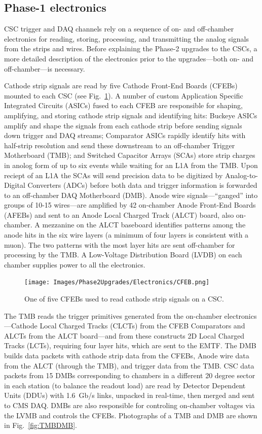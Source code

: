 \subsection{Phase-1 electronics} \label{sec:Phase1CSCelectronics}

CSC trigger and DAQ channels rely on a sequence of on- and off-chamber electronics for reading, storing, processing, and transmitting the analog signals from the strips and wires. Before explaining the Phase-2 upgrades to the CSCs, a more detailed description of the electronics prior to the upgrades---both on- and off-chamber---is necessary. 

Cathode strip signals are read by five Cathode Front-End Boards (CFEBs) mounted to each CSC (see Fig.~\ref{fig:CFEB}). A number of custom Application Specific Integrated Circuits (ASICs) fused to each CFEB are responsible for shaping, amplifying, and storing cathode strip signals and identifying hits: Buckeye ASICs amplify and shape the signals from each cathode strip before sending signals down trigger and DAQ streams; Comparator ASICs rapidly identify hits with half-strip resolution and send these downstream to an off-chamber Trigger Motherboard (TMB); and Switched Capacitor Arrays (SCAs) store strip charges in anolog form of up to six events while waiting for an L1A from the TMB. Upon reciept of an L1A the SCAs will send precision data to be digitized by Analog-to-Digital Converters (ADCs) before both data and trigger information is forwarded to an off-chamber DAQ Motherboard (DMB). Anode wire signals---``ganged'' into groups of 10-15 wires---are amplified by 42 on-chamber Anode Front-End Boards (AFEBs) and sent to an Anode Local Charged Track (ALCT) board, also on-chamber. A mezzanine on the ALCT baseboard identifies patterns among the anode hits in the six wire layers (a minimum of four layers is consistent with a muon). The two patterns with the most layer hits are sent off-chamber for processing by the TMB. A Low-Voltage Distribution Board (LVDB) on each chamber supplies power to all the electronics.

\begin{figure}[H]
    \centering
    {\texttt{[image: Images/Phase2Upgrades/Electronics/CFEB.png]}}
    \caption{One of five CFEBs used to read cathode strip signals on a CSC.}
    \label{fig:CFEB}
\end{figure}

The TMB reads the trigger primitives generated from the on-chamber electronics---Cathode Local Charged Tracks (CLCTs) from the CFEB Comparators and ALCTs from the ALCT board---and from these constructs 2D Local Charged Tracks (LCTs), requiring four layer hits, which are sent to the EMTF. The DMB builds data packets with cathode strip data from the CFEBs, Anode wire data from the ALCT (through the TMB), and trigger data from the TMB. CSC data packets from 15 DMBs corresponding to chambers in a different 20 degree sector in each station (to balance the readout load) are read by Detector Dependent Units (DDUs) with \SI{1.6}{Gb/s} links, unpacked in real-time, then merged and sent to CMS DAQ. DMBs are also responsible for controling on-chamber voltages via the LVMB and controls the CFEBs. Photographs of a TMB and DMB are shown in Fig.~\ref{fig:TMBDMB}.

